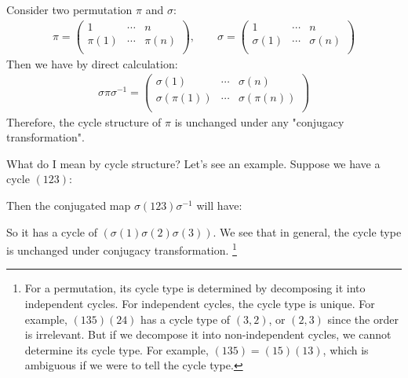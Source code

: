 \begin{key}
    Consider two permutation $\pi$ and $\sigma$:
    \begin{align}
        \pi =\left( \begin{array}{ccc}
             1 & \cdots & n \\
            \pi(1) & \cdots & \pi(n) \\
            \end{array} \right) ,\quad\quad
        \sigma = \left( \begin{array}{ccc}
             1 & \cdots & n \\
            \sigma(1) & \cdots & \sigma(n) \\
            \end{array} \right)
    \end{align}
    Then we have by direct calculation:
    \begin{align}
        \sigma\pi\sigma^{-1} = \left( \begin{array}{ccc}
                \sigma(1)      & \cdots & \sigma(n) \\
                \sigma(\pi(1)) & \cdots & \sigma(\pi(n)) \\
            \end{array} \right)
    \end{align}
    Therefore, the cycle structure of $\pi$ is unchanged under any
    "conjugacy transformation".
\end{key}
What do I mean by cycle structure? Let's see an example. Suppose we
have a cycle $(123)$:
\begin{center}  \end{center}
Then the conjugated map $\sigma (123) \sigma^{-1}$ will have:
\begin{center}  \end{center}
So it has a cycle of $(\sigma(1)\sigma(2)\sigma(3))$.
We see that in general, the cycle type is unchanged under conjugacy
transformation.
\footnote{ For a permutation, its cycle type is determined by
    decomposing it into independent cycles. For independent cycles,
    the cycle type is unique. For example, $(135)(24)$ has a cycle
    type of $(3,2)$, or $(2,3)$ since the order is irrelevant. But if
    we decompose it into non-independent cycles, we cannot determine
    its cycle type. For example, $(135)=(15)(13)$, which is ambiguous
    if we were to tell the cycle type.
}


